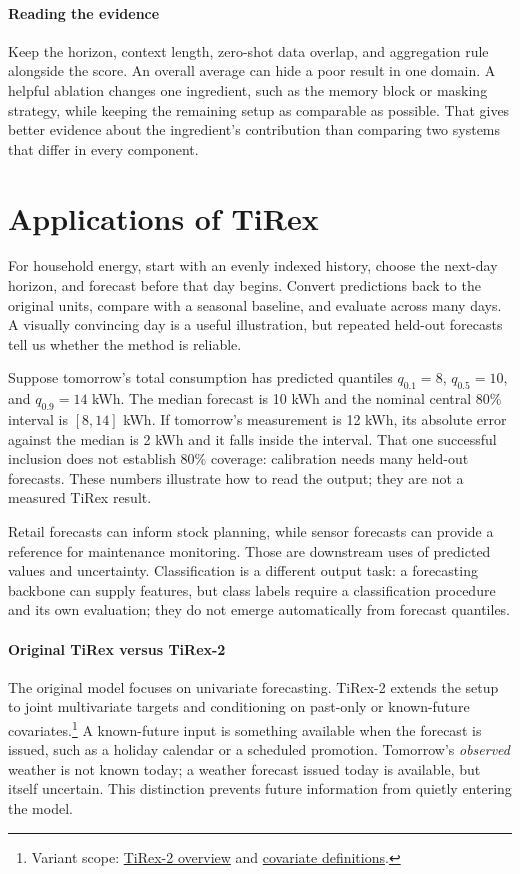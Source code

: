 \documentclass[11pt, oneside]{book}
\let\originalsection\section
\renewcommand{\section}{\Needspace{7\baselineskip}\originalsection}
\begin{document}
\paragraph{Reading the evidence} Keep the horizon, context length, zero-shot data overlap, and aggregation rule alongside the score. An overall average can hide a poor result in one domain. A helpful ablation changes one ingredient, such as the memory block or masking strategy, while keeping the remaining setup as comparable as possible. That gives better evidence about the ingredient's contribution than comparing two systems that differ in every component.

\clearpage
\section{Applications of TiRex}\label{sec:source-9-3}
For household energy, start with an evenly indexed history, choose the next-day horizon, and forecast before that day begins. Convert predictions back to the original units, compare with a seasonal baseline, and evaluate across many days. A visually convincing day is a useful illustration, but repeated held-out forecasts tell us whether the method is reliable.

\begin{exbox}[title={Reading an illustrative energy forecast}]
Suppose tomorrow's total consumption has predicted quantiles $q_{0.1}=8$, $q_{0.5}=10$, and $q_{0.9}=14$ kWh. The median forecast is 10 kWh and the nominal central 80\% interval is $[8,14]$ kWh. If tomorrow's measurement is 12 kWh, its absolute error against the median is 2 kWh and it falls inside the interval. That one successful inclusion does not establish 80\% coverage: calibration needs many held-out forecasts. These numbers illustrate how to read the output; they are not a measured TiRex result.
\end{exbox}

Retail forecasts can inform stock planning, while sensor forecasts can provide a reference for maintenance monitoring. Those are downstream uses of predicted values and uncertainty. Classification is a different output task: a forecasting backbone can supply features, but class labels require a classification procedure and its own evaluation; they do not emerge automatically from forecast quantiles.

\paragraph{Original TiRex versus TiRex-2} The original model focuses on univariate forecasting. TiRex-2 extends the setup to joint multivariate targets and conditioning on past-only or known-future covariates.\footnote{Variant scope: \href{https://nx-ai.github.io/tirex-2/introduction/}{TiRex-2 overview} and \href{https://nx-ai.github.io/tirex-2/how-to/covariates/}{covariate definitions}.} A known-future input is something available when the forecast is issued, such as a holiday calendar or a scheduled promotion. Tomorrow's \emph{observed} weather is not known today; a weather forecast issued today is available, but itself uncertain. This distinction prevents future information from quietly entering the model.
\end{document}
